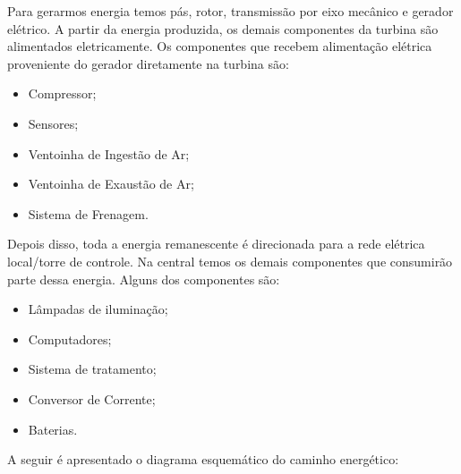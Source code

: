 Para gerarmos energia temos pás, rotor, transmissão por eixo mecânico e gerador elétrico. A partir da energia produzida, os demais componentes da turbina são alimentados eletricamente. Os componentes que recebem alimentação elétrica proveniente do gerador  diretamente na turbina são:
\begin{itemize}
\item Compressor;
\item Sensores;
\item Ventoinha de Ingestão de Ar;
\item Ventoinha de Exaustão de Ar;
\item Sistema de Frenagem.
\end{itemize}

Depois disso, toda a energia remanescente é direcionada para a rede elétrica local/torre de controle. Na central temos os demais componentes que consumirão parte dessa energia. Alguns dos componentes são:
\begin{itemize}
\item Lâmpadas de iluminação;
\item Computadores;
\item Sistema de tratamento;
\item Conversor de Corrente;
\item Baterias.

\end{itemize}

A seguir é apresentado o diagrama esquemático do caminho energético: